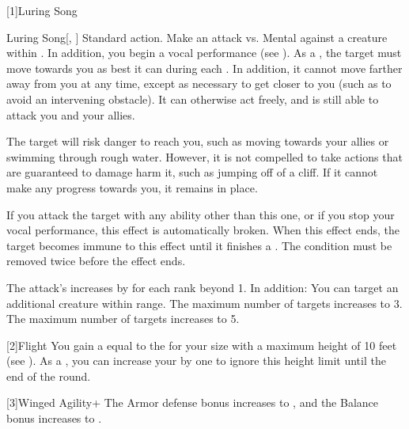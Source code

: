     [1]{Luring Song}
    \begin{magicalactiveability}{Luring Song}[, ]
      \abilityusagetime Standard action.
      \rankline
      Make an attack vs. Mental against a creature within \longrange.
      In addition, you begin a vocal performance (see ).
      \hit As a , the target must move towards you as best it can during each .
      In addition, it cannot move farther away from you at any time, except as necessary to get closer to you (such as to avoid an intervening obstacle).
      It can otherwise act freely, and is still able to attack you and your allies.

      The target will risk danger to reach you, such as moving towards your allies or swimming through rough water.
      However, it is not compelled to take actions that are guaranteed to damage harm it, such as jumping off of a cliff.
      If it cannot make any progress towards you, it remains in place.

      If you attack the target with any ability other than this one, or if you stop your vocal performance, this effect is automatically broken.
      When this effect ends, the target becomes immune to this effect until it finishes a .
      \crit The condition must be removed twice before the effect ends.

      \rankline
      The attack's  increases by  for each rank beyond 1.
      In addition:
       You can target an additional creature within range.
       The maximum number of targets increases to 3.
       The maximum number of targets increases to 5.
    \end{magicalactiveability}

    [2]{Flight} You gain a  equal to the  for your size with a maximum height of 10 feet (see ).
      As a , you can increase your  by one to ignore this height limit until the end of the round.

    [3]{Winged Agility+} The Armor defense bonus increases to , and the Balance bonus increases to .

